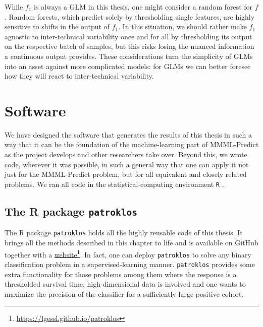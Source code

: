 While $f_1$ is always a GLM in this thesis, one might consider a random forest for $f$. Random 
forests, which predict solely by thresholding single features, are highly sensitive to shifts in 
the output of $f_1$. In this situation, we should rather make $f_1$ agnostic to inter-technical 
variability once and 
for all by thresholding its output on the respective batch of samples, but this risks losing the 
nuanced information a continuous output provides. These considerations turn the simplicity of GLMs 
into an asset against more complicated models: for GLMs we can better foresee how they will react 
to inter-technical variability.

\section{Software}

We have designed the software that generates the results of this thesis in such a way that it 
can be the foundation of the machine-learning part of MMML-Predict as the project develops and 
other researchers take over. Beyond this, we wrote code, wherever it was possible, in such 
a general way that one can apply it not just for the MMML-Predict problem, but for all equivalent 
and closely related problems. We ran all code in the statistical-computing environment \texttt{R}
\cite{r-language}.

\subsection{The R package \texttt{patroklos}}
The R package \texttt{patroklos} holds all the highly reusable code of this thesis. It brings 
all the methods described in this chapter to life and is available on GitHub \cite{patroklos-gh} 
together with a 
\href{https://lgessl.github.io/patroklos/}{website}\footnote{\url{https://lgessl.github.io/patroklos}}. 
In fact, one can deploy 
\texttt{patroklos} to solve any binary classification problem in a supervised-learning manner.
\texttt{patroklos} provides some extra functionality for those problems among them where the 
response is a thresholded survival time, high-dimensional data is involved and one wants to maximize 
the precision of the classifier for a sufficiently large positive cohort.

